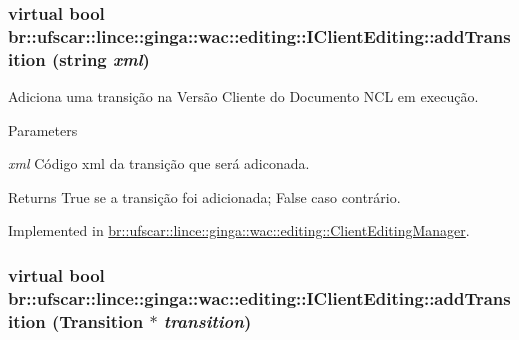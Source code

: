 \hypertarget{classbr_1_1ufscar_1_1lince_1_1ginga_1_1wac_1_1editing_1_1IClientEditing_ab485ec1908e00b24e451f138446885af}{
\subsubsection[{addTransition}]{\setlength{\rightskip}{0pt plus 5cm}virtual bool br::ufscar::lince::ginga::wac::editing::IClientEditing::addTransition (string {\em xml})}}
\label{classbr_1_1ufscar_1_1lince_1_1ginga_1_1wac_1_1editing_1_1IClientEditing_ab485ec1908e00b24e451f138446885af}


Adiciona uma transição na Versão Cliente do Documento NCL em execução. 


\begin{DoxyParams}{Parameters}
\item[{\em xml}]Código xml da transição que será adiconada. \end{DoxyParams}
\begin{DoxyReturn}{Returns}
True se a transição foi adicionada; False caso contrário. 
\end{DoxyReturn}


Implemented in \hyperlink{classbr_1_1ufscar_1_1lince_1_1ginga_1_1wac_1_1editing_1_1ClientEditingManager_a474cdd2a429ab96cb5376264ff38fa31}{br::ufscar::lince::ginga::wac::editing::ClientEditingManager}.

\hypertarget{classbr_1_1ufscar_1_1lince_1_1ginga_1_1wac_1_1editing_1_1IClientEditing_a8de701b01f8095605897a83002ea9fb0}{
\subsubsection[{addTransition}]{\setlength{\rightskip}{0pt plus 5cm}virtual bool br::ufscar::lince::ginga::wac::editing::IClientEditing::addTransition (Transition $\ast$ {\em transition})}}
\label{classbr_1_1ufscar_1_1lince_1_1ginga_1_1wac_1_1editing_1_1IClientEditing_a8de701b01f8095605897a83002ea9fb0}


